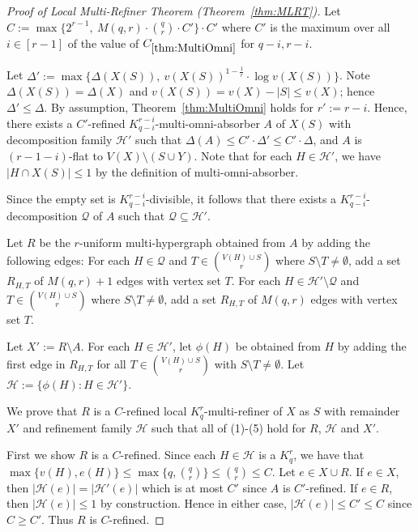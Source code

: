 \documentclass[11pt]{article}
\newcounter{i}
\theoremstyle{plain}
\theoremstyle{plain} %
\theoremstyle{definition}
\begin{document}
\begin{proof}[Proof of Local Multi-Refiner Theorem (Theorem~\ref{thm:MLRT})]
Let $C:= \max\{2^{r-1},~M(q,r)\cdot \binom{q}{r}\cdot C'\} \cdot C'$ where $C'$ is the maximum over all $i\in[r-1]$ of the value of $C_{\ref{thm:MultiOmni}}$ for $q-i, r-i$. 

Let $\Delta':=\max\{\Delta(X(S)),~v(X(S))^{1-\frac{1}{r}}\cdot \log v(X(S))\}$. Note $\Delta(X(S))=\Delta(X)$ and $v(X(S)) = v(X)-|S| \le v(X)$; hence $\Delta' \le \Delta$. By assumption, Theorem~\ref{thm:MultiOmni} holds for $r' := r-i$. Hence, there exists a $C'$-refined $K_{q-i}^{r-i}$-multi-omni-absorber $A$ of $X(S)$ with decomposition family $\mathcal{H}'$ such that $\Delta(A)\le C' \cdot \Delta' \le C'\cdot \Delta$, and $A$ is $(r-1-i)$-flat to $V(X)\setminus (S\cup Y)$. Note that for each $H\in\mathcal{H}'$, we have $|H\cap X(S)|\le 1$ by the definition of multi-omni-absorber. 

Since the empty set is $K_{q-i}^{r-i}$-divisible, it follows that there exists a $K_{q-i}^{r-i}$-decomposition $\mathcal{Q}$ of $A$ such that $\mathcal{Q}\subseteq \mathcal{H}'$. 



Let $R$ be the $r$-uniform multi-hypergraph obtained from $A$ by adding the following edges: For each $H\in \mathcal{Q}$ and $T \in \binom{V(H)\cup S}{r}$ where $S\setminus T\ne \emptyset$, add a set $R_{H,T}$ of $M(q,r)+1$ edges with vertex set $T$. For each $H\in \mathcal{H}'\setminus \mathcal{Q}$ and $T \in \binom{V(H)\cup S}{r}$ where $S\setminus T\ne \emptyset$, add a set $R_{H,T}$ of $M(q,r)$ edges with vertex set $T$. 

Let $X':= R\setminus A$. For each $H\in\mathcal{H}'$, let $\phi(H)$ be obtained from $H$ by adding the first edge in $R_{H,T}$ for all $T \in \binom{V(H)\cup S}{r}$ with $S\setminus T\ne \emptyset$. Let $\mathcal{H} := \{\phi(H): H\in \mathcal{H}'\}$. 

We prove that $R$ is a $C$-refined local $K_q^r$-multi-refiner of $X$ as $S$ with remainder $X'$ and refinement family $\mathcal{H}$ such that all of (1)-(5) hold for $R$, $\mathcal{H}$ and $X'$.

First we show $R$ is a $C$-refined. Since each $H\in\mathcal{H}$ is a $K_q^r$, we have that $\max\{v(H),e(H)\} \le \max\{q,\binom{q}{r}\} \le \binom{q}{r} \le C$. Let $e\in X\cup R$. If $e\in X$, then $|\mathcal{H}(e)| = |\mathcal{H}'(e)|$ which is at most $C'$ since $A$ is $C'$-refined. If $e\in R$, then $|\mathcal{H}(e)|\le 1$ by construction. Hence in either case, $|\mathcal{H}(e)|\le C' \le C$ since $C\ge C'$. Thus $R$ is $C$-refined.



\end{proof}
\end{document}

